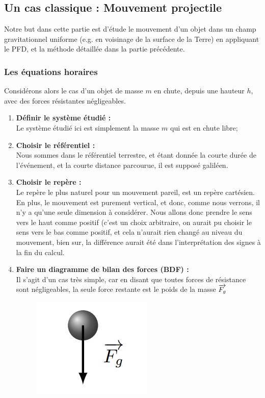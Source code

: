 \documentclass[11pt,a4paper]{article}
\begin{document}
\subsection{Un cas classique : Mouvement projectile}
Notre but dans cette partie est d'étude le mouvement d'un objet dans un champ gravitationnel uniforme (e.g. en voisinage de la surface de la Terre) en appliquant le PFD, et la méthode détaillée dans la partie précédente. 

\subsubsection{Les équations horaires}
Considérons alors le cas d’un objet de masse $m$ en chute, depuis une hauteur $h$, avec des forces résistantes négligeables. 

\begin{enumerate}
    \item \textbf{Définir le système étudié : } \\
    Le système étudié ici est simplement la masse $m$ qui est en chute libre; 
    \item \textbf{Choisir le référentiel :} \\
    Nous sommes dans le référentiel terrestre, et étant donnée la courte durée de l'événement, et la courte distance parcourue, il est supposé galiléen. 
    \item \textbf{Choisir le repère : }\\
    Le repère le plus naturel pour un mouvement pareil, est un repère cartésien. En plus, le mouvement est purement vertical, et donc, comme nous verrons, il n'y a qu'une seule dimension à considérer. 
    Nous allons donc prendre le sens vers le haut comme positif (c'est un choix arbitraire, on aurait pu choisir le sens vers le bas comme positif, et cela n'aurait rien changé au niveau du mouvement, bien sur, la différence aurait été dans l'interprétation des signes à la fin du calcul.
    \item \textbf{Faire un diagramme de bilan des forces (BDF) : }\\
    Il s'agit d'un cas très simple, car en disant que toutes forces de résistance sont négligeables, la seule force restante est le poids de la masse $\overrightarrow{F_g}$
    \begin{figure}[H]
        \centering
        \includegraphics[width=0.1\linewidth]{imgs/p3/chutelibre.jpg}
    \end{figure}
    

\end{enumerate}
\end{document}
